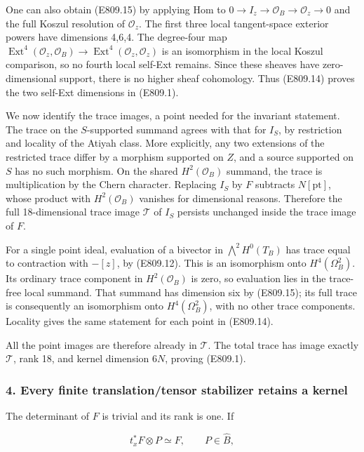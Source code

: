 One can also obtain (E809.15) by applying Hom to
\(0\to I_z\to\mathcal O_B\to\mathcal O_z\to0\) and the full Koszul
resolution of \(\mathcal O_z\). The first three local tangent-space
exterior powers have dimensions 4,6,4. The degree-four map
\(\operatorname{Ext}^4(\mathcal O_z,\mathcal O_B)\to\operatorname{Ext}^4(\mathcal O_z,\mathcal O_z)\)
is an isomorphism in the local Koszul comparison, so no fourth local
self-Ext remains. Since these sheaves have zero-dimensional support,
there is no higher sheaf cohomology. Thus (E809.14) proves the two
self-Ext dimensions in (E809.1).

We now identify the trace images, a point needed for the invariant
statement. The trace on the \(S\)-supported summand agrees with that for
\(I_S\), by restriction and locality of the Atiyah class. More
explicitly, any two extensions of the restricted trace differ by a
morphism supported on \(Z\), and a source supported on \(S\) has no such
morphism. On the shared \(H^2(\mathcal O_B)\) summand, the trace is
multiplication by the Chern character. Replacing \(I_S\) by \(F\)
subtracts \(N[\mathrm{pt}]\), whose product with \(H^2(\mathcal O_B)\)
vanishes for dimensional reasons. Therefore the full 18-dimensional
trace image \(\mathcal T\) of \(I_S\) persists unchanged inside the
trace image of \(F\).

For a single point ideal, evaluation of a bivector in
\(\bigwedge^2H^0(T_B)\) has trace equal to contraction with \(-[z]\), by
(E809.12). This is an isomorphism onto \(H^4(\Omega_B^2)\). Its ordinary
trace component in \(H^2(\mathcal O_B)\) is zero, so evaluation lies in
the trace-free local summand. That summand has dimension six by
(E809.15); its full trace is consequently an isomorphism onto
\(H^4(\Omega_B^2)\), with no other trace components. Locality gives the
same statement for each point in (E809.14).

All the point images are therefore already in \(\mathcal T\). The total
trace has image exactly \(\mathcal T\), rank 18, and kernel dimension
\(6N\), proving (E809.1).

\subsubsection{4. Every finite translation/tensor stabilizer retains a
kernel}\label{every-finite-translationtensor-stabilizer-retains-a-kernel}

The determinant of \(F\) is trivial and its rank is one. If

\[
 t_x^*F\otimes P\simeq F,\qquad P\in\widehat B,
\]

